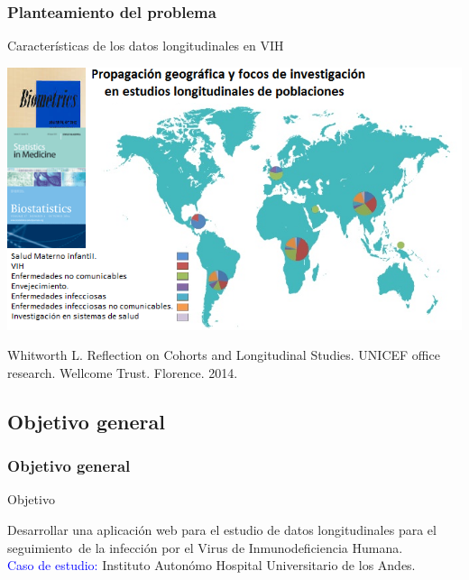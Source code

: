 \documentclass{beamer}%
\begin{document}
\begin{frame}[fragile]
\frametitle{\textbf{Planteamiento del problema}}
\begin{block}{Caracter\'isticas de los datos longitudinales en VIH}
\end{block}
	\begin{center}\includegraphics[height=0.5\textheight]{LON.PNG}\end{center}
\tiny{Whitworth L. Reflection on Cohorts and Longitudinal Studies. UNICEF office research. Wellcome Trust. Florence. 2014.}\\
\end{frame}
\subsection{Objetivo general}

\begin{frame}[fragile]
\frametitle{\textbf{Objetivo general}}
\begin{block}{Objetivo}
\end{block}
Desarrollar una aplicaci\'on web para el estudio de datos longitudinales para el
seguimiento\ de la infecci\'on por el Virus de  Inmunodeficiencia Humana.\\
\textcolor{blue}{Caso de estudio:} Instituto Auton\'omo Hospital Universitario de los Andes.
\end{frame}
\end{document}
